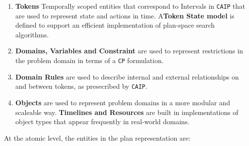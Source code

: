 \begin{enumerate}

\item \textbf{Tokens} Temporally scoped entities that correspond to
  Intervals in \texttt{CAIP} that are used to represent state and
  actions in time. A\textbf{Token State model} is defined to support
  an efficient implementation of plan-space search algorithms.

\item \textbf{Domains, Variables and Constraint} are used to represent
  restrictions in the problem domain in terms of a \texttt{CP}
  formulation.

\item \textbf{Domain Rules} are used to describe internal and external
  relationships on and between tokens, as presecribed by
  \texttt{CAIP}.
  
\item \textbf{Objects} are used to represent problem domains in a more
  modular and scaleable way. \textbf{Timelines and Resources} are
  built in implementations of object types that appear frequently in
  real-world domains.

\end{enumerate}

At the atomic level, the entities in the \eu plan representation are:

